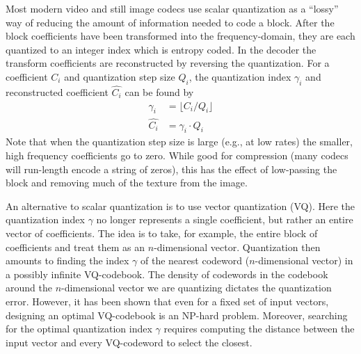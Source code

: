 \documentclass[conference, 10pt]{IEEEtran}
\begin{document}
Most modern video and still image codecs use scalar quantization as a ``lossy''
 way of reducing the amount of information needed to code a block.
After the block coefficients have been transformed into the frequency-domain,
 they are each quantized to an integer index which is entropy coded.
In the decoder the transform coefficients are reconstructed by reversing the
 quantization.
For a coefficient $C_i$ and quantization step size $Q_i$, the quantization
 index $\gamma_i$ and reconstructed coefficient $\hat{C_i}$ can be found by
\begin{align}
\gamma_i & = \lfloor C_i / Q_i\rfloor \\
\hat{C_i} & = \gamma_i\cdot Q_i
\end{align}
Note that when the quantization step size is large (e.g., at low rates) the
 smaller, high frequency coefficients go to zero.
While good for compression (many codecs will run-length encode a string of
 zeros), this has the effect of low-passing the block and removing much of the
 texture from the image.

An alternative to scalar quantization is to use vector quantization (VQ).
Here the quantization index $\gamma$ no longer represents a single coefficient,
 but rather an entire vector of coefficients.
The idea is to take, for example, the entire block of coefficients and treat
 them as an $n$-dimensional vector.
Quantization then amounts to finding the index $\gamma$ of the nearest codeword
 ($n$-dimensional vector) in a possibly infinite VQ-codebook.
The density of codewords in the codebook around the $n$-dimensional vector we
 are quantizing dictates the quantization error.
However, it has been shown that even for a fixed set of input vectors,
 designing an optimal VQ-codebook is an NP-hard problem.
Moreover, searching for the optimal quantization index $\gamma$ requires
 computing the distance between the input vector and every VQ-codeword to
 select the closest.
\end{document}
